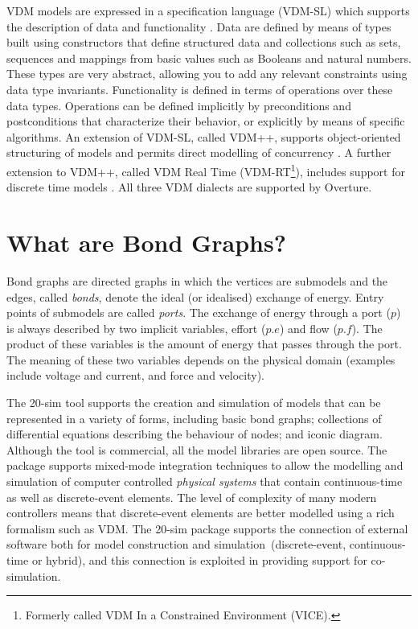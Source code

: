 \documentclass{crescendorepchap}
\begin{document}
VDM models are expressed in a specification language (VDM-SL) which
supports the description of data and functionality
\cite{ISOVDM96a,Fitzgerald&98b,Fitzgerald&09}. Data are defined by
means of types built using constructors that define structured data
and collections such as sets, sequences and mappings from basic values
such as Booleans and natural numbers. These types are very abstract,
allowing you to add any relevant constraints using data type
invariants. Functionality is defined in terms of operations over these
data types. Operations can be defined implicitly by preconditions and
postconditions that characterize their behavior, or explicitly by
means of specific algorithms. An extension of VDM-SL, called VDM++,
supports object-oriented structuring of models and permits direct
modelling of concurrency \cite{Fitzgerald&05}. A further extension
to VDM++, called VDM Real Time (VDM-RT\footnote{Formerly called VDM In a
Constrained Environment (VICE).}), includes support for discrete
time models \cite{Mukherjee&00,Verhoef&06b}. All
three VDM dialects are supported by Overture.

\section{What are Bond Graphs?}\label{sec:bond}

Bond graphs are directed graphs in which the vertices are submodels
and the edges, called \textit{bonds}, denote the ideal (or idealised)
exchange of energy. Entry points of submodels are called
\textit{ports}. The exchange of energy through a port ($p$) is always
described by two implicit variables, effort ($p.e$) and flow
($p.f$). The product of these variables is the amount of energy that
passes through the port. The meaning of these two variables depends on
the physical domain (examples include voltage and current, and force
and velocity).

The 20-sim tool supports the creation and simulation of models that
can be represented in a variety of forms, including basic bond graphs;
collections of differential equations describing the behaviour of
nodes; and iconic diagram. Although the tool is commercial, all the
model libraries are open source. The package supports mixed-mode
integration techniques to allow the modelling and simulation of
computer controlled \textit{physical systems} that contain
continuous-time as well as discrete-event elements. The level of
complexity of many modern controllers means that discrete-event
elements are better modelled using a rich formalism such as VDM. The
20-sim package supports the connection of external software both for
model construction and simulation~(discrete-event, continuous-time or
hybrid), and this connection is exploited in providing support for
co-simulation.
\end{document}
